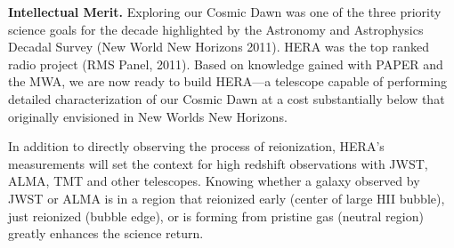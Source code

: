 \documentclass[preprint]{aastex}
\def\HI{{H{\small I }}}
\def\HII{{H{\small II }}}
\begin{document}

\vspace{.25 cm}
\noindent
{\bf Intellectual Merit.}
%
Exploring our Cosmic Dawn was one of the three priority science goals for the decade highlighted
by the Astronomy and Astrophysics Decadal Survey (New World New Horizons 2011). HERA was the top ranked radio project (RMS Panel, 2011). Based on knowledge gained with PAPER and the MWA, we are now ready to build HERA---a telescope
capable of performing detailed characterization of our Cosmic Dawn at
a cost substantially below that originally envisioned in New Worlds New Horizons. 

In addition to directly observing the process of reionization, HERA's
measurements will set the context for high redshift observations with JWST,
ALMA, TMT and other telescopes. Knowing whether a galaxy observed by JWST or %
ALMA is in a region that reionized early (center of large \HII bubble), just
reionized (bubble edge), or is forming from pristine gas (neutral region)
greatly enhances the science return.

\end{document}
